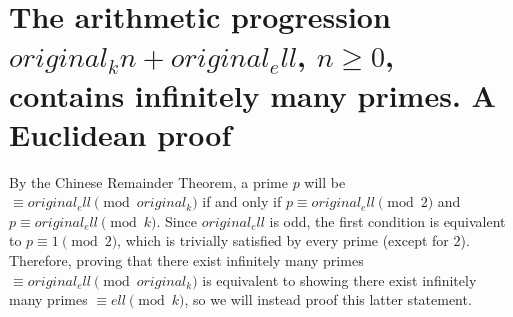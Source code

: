 \section{The arithmetic progression ${original_k}n+{original_ell}$, $n\geqslant0$, contains infinitely many primes. A Euclidean proof}

By the Chinese Remainder Theorem, a prime $p$ will be $\equiv{original_ell}\pmod{{original_k}}$ if and only if $p\equiv{original_ell}\pmod{2}$ and $p\equiv{original_ell}\pmod{{k}}$. Since ${original_ell}$ is odd, the first condition is equivalent to $p\equiv 1\pmod{2}$, which is trivially satisfied by every prime (except for $2$). Therefore, proving that there exist infinitely many primes $\equiv{original_ell}\pmod{{original_k}}$ is equivalent to showing there exist infinitely many primes $\equiv {ell}\pmod{{k}}$, so we will instead proof this latter statement.